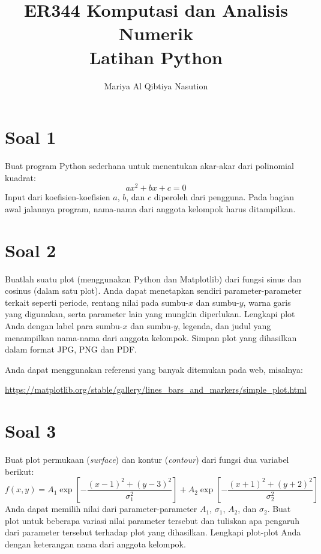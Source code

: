 



\title{%
{\small ER344 Komputasi dan Analisis Numerik}\\
Latihan Python
}
\author{Mariya Al Qibtiya Nasution}
\date{}
\maketitle

\section{Soal 1}
Buat program Python sederhana untuk menentukan akar-akar dari polinomial
kuadrat:
\begin{equation*}
ax^2 + bx + c = 0
\end{equation*}
Input dari koefisien-koefisien $a$, $b$, dan $c$ diperoleh dari pengguna.
Pada bagian awal jalannya program, nama-nama dari anggota kelompok harus
ditampilkan.


\section{Soal 2}
Buatlah suatu plot (menggunakan Python dan Matplotlib)
dari fungsi sinus dan cosinus (dalam satu plot).
Anda dapat menetapkan sendiri parameter-parameter terkait seperti
periode, rentang nilai pada sumbu-$x$ dan sumbu-$y$, warna garis yang
digunakan, serta parameter lain yang mungkin diperlukan.
Lengkapi plot Anda dengan label para sumbu-$x$ dan sumbu-$y$, legenda,
dan judul yang menampilkan nama-nama dari anggota kelompok.
Simpan plot yang dihasilkan dalam format JPG, PNG dan PDF.

Anda dapat menggunakan referensi yang banyak ditemukan pada web, misalnya:

{\footnotesize
\url{https://matplotlib.org/stable/gallery/lines_bars_and_markers/simple_plot.html}}

\section{Soal 3}
Buat plot permukaan (\textit{surface}) dan kontur (\textit{contour})
dari fungsi dua variabel berikut:
\begin{equation*}
f(x,y) = A_{1} \exp\left[ -\frac{(x-1)^2 + (y-3)^2}{\sigma_{1}^{2}} \right] +
A_{2} \exp\left[ -\frac{(x+1)^2 + (y+2)^2}{\sigma_{2}^{2}} \right]
\end{equation*}
Anda dapat memilih nilai dari parameter-parameter $A_{1}$, $\sigma_{1}$,
$A_{2}$, dan $\sigma_{2}$. Buat plot untuk beberapa variasi nilai
parameter tersebut dan tuliskan apa pengaruh dari parameter tersebut
terhadap plot yang dihasilkan.
Lengkapi plot-plot Anda dengan keterangan nama dari anggota kelompok.

